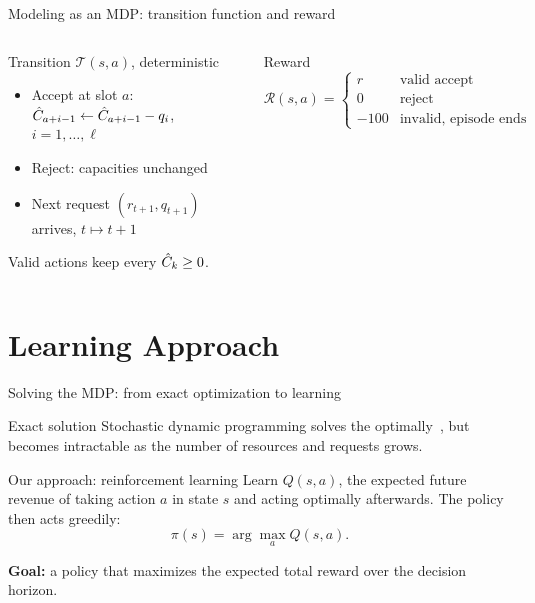 \documentclass[aspectratio=169, 11pt]{beamer}
\begin{document}
\begin{frame}{Modeling as an MDP: transition function and reward}
  \begin{columns}[c]
      \centering
      \ProblemGraphic
      \begin{block}{Transition $\mathcal{T}(s,a)$, deterministic}
        \begin{itemize}
          \item Accept at slot $a$:\\
            $\hat{C}_{a+i-1} \leftarrow \hat{C}_{a+i-1} - q_i$, \ $i=1,\dots,\ell$
          \item Reject: capacities unchanged
          \item Next request $(r_{t+1}, q_{t+1})$ arrives, $t \mapsto t+1$
        \end{itemize}
        Valid actions keep every $\hat{C}_k \geq 0$.
      \end{block}
      \begin{block}{Reward}
        $\mathcal{R}(s,a)=
          \begin{cases}
            r    & \text{valid accept}\\
            0    & \text{reject}\\
            -100 & \text{invalid, episode ends}
          \end{cases}$
      \end{block}
  \end{columns}
\end{frame}

\section{Learning Approach}

\begin{frame}{Solving the MDP: from exact optimization to learning}
  \begin{block}{Exact solution}
    Stochastic dynamic programming solves the \drausp{} optimally~\cite{drausp_lion18},
    but becomes intractable as the number of resources and requests grows.
  \end{block}

  \begin{block}{Our approach: reinforcement learning}
    Learn $Q(s,a)$, the expected future revenue of taking action $a$ in state $s$
    and acting optimally afterwards. The policy then acts greedily:
    \[
      \pi(s) = \arg\max_{a} Q(s,a).
    \]
  \end{block}

  \textbf{Goal:} a policy that maximizes the expected total reward over the decision horizon.
\end{frame}
\end{document}
